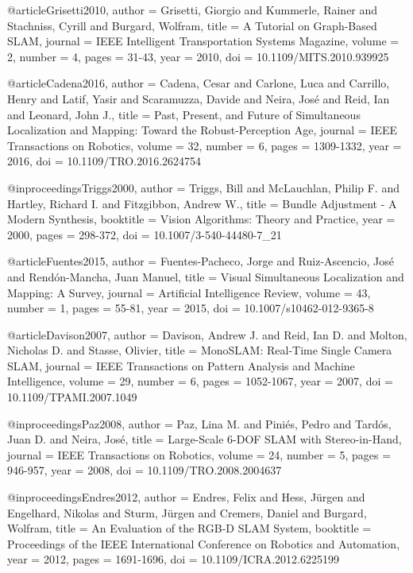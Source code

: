 @article{Grisetti2010,
  author = {Grisetti, Giorgio and Kummerle, Rainer and Stachniss, Cyrill and Burgard, Wolfram},
  title = {A Tutorial on Graph-Based SLAM},
  journal = {IEEE Intelligent Transportation Systems Magazine},
  volume = {2},
  number = {4},
  pages = {31-43},
  year = {2010},
  doi = {10.1109/MITS.2010.939925}
}

@article{Cadena2016,
  author = {Cadena, Cesar and Carlone, Luca and Carrillo, Henry and Latif, Yasir and Scaramuzza, Davide and Neira, José and Reid, Ian and Leonard, John J.},
  title = {Past, Present, and Future of Simultaneous Localization and Mapping: Toward the Robust-Perception Age},
  journal = {IEEE Transactions on Robotics},
  volume = {32},
  number = {6},
  pages = {1309-1332},
  year = {2016},
  doi = {10.1109/TRO.2016.2624754}
}

@inproceedings{Triggs2000,
  author = {Triggs, Bill and McLauchlan, Philip F. and Hartley, Richard I. and Fitzgibbon, Andrew W.},
  title = {Bundle Adjustment - A Modern Synthesis},
  booktitle = {Vision Algorithms: Theory and Practice},
  year = {2000},
  pages = {298-372},
  doi = {10.1007/3-540-44480-7_21}
}

@article{Fuentes2015,
  author = {Fuentes-Pacheco, Jorge and Ruiz-Ascencio, José and Rendón-Mancha, Juan Manuel},
  title = {Visual Simultaneous Localization and Mapping: A Survey},
  journal = {Artificial Intelligence Review},
  volume = {43},
  number = {1},
  pages = {55-81},
  year = {2015},
  doi = {10.1007/s10462-012-9365-8}
}

@article{Davison2007,
  author = {Davison, Andrew J. and Reid, Ian D. and Molton, Nicholas D. and Stasse, Olivier},
  title = {MonoSLAM: Real-Time Single Camera SLAM},
  journal = {IEEE Transactions on Pattern Analysis and Machine Intelligence},
  volume = {29},
  number = {6},
  pages = {1052-1067},
  year = {2007},
  doi = {10.1109/TPAMI.2007.1049}
}

@inproceedings{Paz2008,
  author = {Paz, Lina M. and Piniés, Pedro and Tardós, Juan D. and Neira, José},
  title = {Large-Scale 6-DOF SLAM with Stereo-in-Hand},
  journal = {IEEE Transactions on Robotics},
  volume = {24},
  number = {5},
  pages = {946-957},
  year = {2008},
  doi = {10.1109/TRO.2008.2004637}
}

@inproceedings{Endres2012,
  author = {Endres, Felix and Hess, Jürgen and Engelhard, Nikolas and Sturm, Jürgen and Cremers, Daniel and Burgard, Wolfram},
  title = {An Evaluation of the RGB-D SLAM System},
  booktitle = {Proceedings of the IEEE International Conference on Robotics and Automation},
  year = {2012},
  pages = {1691-1696},
  doi = {10.1109/ICRA.2012.6225199}
}

